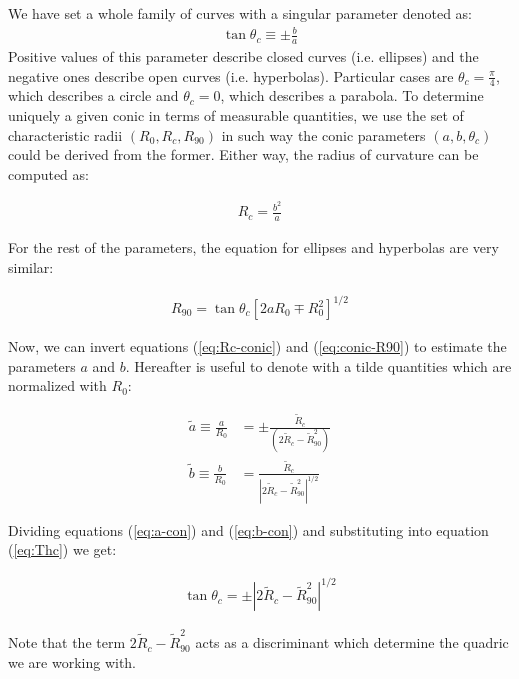We have set a whole family of curves with a singular parameter denoted as:
\begin{align}
  \tan\theta_c \equiv \pm\frac{b}{a}\label{eq:Thc}
\end{align}
Positive values of this parameter describe closed curves (i.e. ellipses) and the negative ones describe open curves (i.e. hyperbolas).
Particular cases are $\theta_c =\frac{\pi}{4}$,
which describes a circle and $\theta_c=0$, which describes a parabola.
To determine uniquely a given conic in terms of measurable quantities, we use the set of characteristic radii $(R_0,R_c,R_{90})$ in such way the conic
parameters $(a,b,\theta_c)$ could be derived from the former. Either way, the radius of curvature can be computed as:

\begin{align}
R_c = \frac{b^2}{a} \label{eq:Rc-conic}
\end{align}

For the rest of the parameters, the equation for ellipses and hyperbolas are very similar:

\begin{align}
R_{90} = \tan\theta_c\left[2aR_0\mp R_0^2\right]^{1/2}\label{eq:conic-R90}
\end{align}


Now, we can invert equations (\ref{eq:Rc-conic}) and (\ref{eq:conic-R90}) to estimate the parameters $a$ and $b$.
Hereafter is useful to denote with a tilde quantities which are normalized with $R_0$:


\begin{align}
  \tilde{a}\equiv \frac{a}{R_0} &= \pm\frac{\tilde{R}_c}{\left(2\tilde{R}_c-\tilde{R}_{90}^2\right)} \label{eq:a-con}\\
  \tilde{b}\equiv \frac{b}{R_0} &= \frac{\tilde{R}_c}{\left|2\tilde{R}_c-\tilde{R}_{90}^2\right|^{1/2}} \label{eq:b-con}
\end{align}


Dividing equations (\ref{eq:a-con}) and (\ref{eq:b-con}) and substituting into equation (\ref{eq:Thc}) we get:

\begin{align}
\tan\theta_c = \pm \left|2\tilde{R}_c-\tilde{R}_{90}^2\right|^{1/2} \label{eq:th_c}
\end{align}

Note that the term $2\tilde{R}_c-\tilde{R}_{90}^2$ acts as a discriminant which determine the quadric we are working with.

